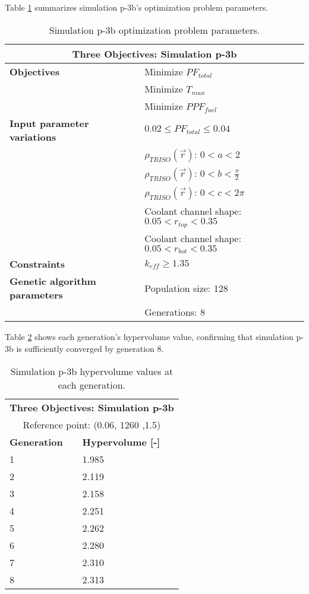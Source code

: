 Table \ref{tab:simulationp3b} summarizes simulation p-3b's optimization problem 
parameters. 
\begin{table}[htbp!]
    \centering
    \onehalfspacing
    \caption{Simulation p-3b optimization problem parameters.}
	\label{tab:simulationp3b}
    \footnotesize
    \begin{tabular}{l|p{6.5cm}}
    \hline 
    \multicolumn{2}{c}{\textbf{Three Objectives: Simulation p-3b}} \\
    \hline 
    \textbf{Objectives} & Minimize $PF_{total}$ \\
    & Minimize $T_{max}$ \\
    & Minimize $PPF_{fuel}$ \\
    \hline 
    \textbf{Input parameter variations} & $0.02 \leq PF_{total} \leq 0.04$ \\
    & $\rho_{TRISO}(\vec{r})$: $0<a<2$ \\
    & $\rho_{TRISO}(\vec{r})$: $0<b<\frac{\pi}{2}$ \\
    & $\rho_{TRISO}(\vec{r})$: $0<c<2\pi$ \\
    & Coolant channel shape: $0.05<r_{top}<0.35$ \\
    & Coolant channel shape: $0.05<r_{bot}<0.35$ \\
    \hline
    \textbf{Constraints} & $k_{eff} \geq 1.35$\\ 
    \hline 
    \textbf{Genetic algorithm parameters} & Population size: 128 \\
    & Generations: 8 \\
    \hline
    \end{tabular}
\end{table}
Table \ref{tab:p3b-hypervolume} shows each generation's hypervolume value, 
confirming that simulation p-3b is sufficiently converged by generation 8. 
\begin{table}[htbp!]
    \centering
    \onehalfspacing
    \caption{Simulation p-3b hypervolume values at each generation.}
	\label{tab:p3b-hypervolume}
    \footnotesize
    \begin{tabular}{ll}
    \hline 
    \multicolumn{2}{c}{\textbf{Three Objectives: Simulation p-3b}} \\
    \multicolumn{2}{c}{Reference point: (0.06, 1260 ,1.5)} \\
    \hline 
    \textbf{Generation} & \textbf{Hypervolume [-]} \\
    \hline
    1 & 1.985 \\
    2 & 2.119 \\
    3 & 2.158 \\
    4 & 2.251\\
    5 & 2.262 \\
    6 & 2.280 \\
    7 & 2.310 \\
    8 & 2.313 \\
    \hline
    \end{tabular}
\end{table}

